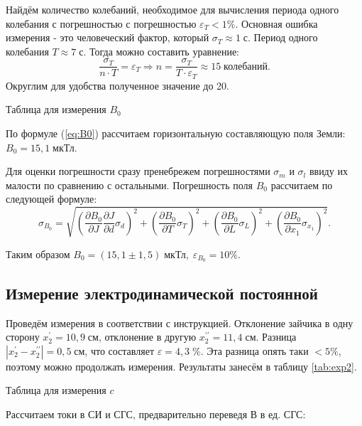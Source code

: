 \documentclass[12pt,a4paper]{article}
\begin{document}
Найдём количество колебаний, необходимое для вычисления периода одного колебания с погрешностью с погрешностью $\varepsilon_T<1\%$. Основная ошибка измерения - это человеческий фактор, который $\sigma_T \approx 1 \; \text{с}$. Период одного колебания $T \approx 7 \; \text{с}$. Тогда можно составить уравнение:
    $$\frac{\sigma_T}{n \cdot T} = \varepsilon_T \Rightarrow n = \frac{\sigma_T}{T\cdot \varepsilon_T} \approx 15 \; \text{колебаний.}$$
Округлим для удобства полученное значение до 20.

\begin{table}[H]
	\caption{Таблица для измерения $B_0$}
	
	\label{tab:exp1}
\end{table}

По формуле (\ref{eq:B0}) рассчитаем горизонтальную составляющую поля Земли: $B_0 = 15,1 \; \text{мкТл}$.

Для оценки погрешности сразу пренебрежем погрешностями $\sigma_m$ и $\sigma_l$ ввиду их малости по сравнению с остальными. Погрешность поля $B_0$ рассчитаем по следующей формуле:
$$\sigma_{B_0}=\sqrt{\left(\frac{\partial B_0}{\partial J}\frac{\partial J}{\partial d}\sigma_d \right)^2+\left(\frac{\partial B_0}{\partial T}\sigma_T \right)^2+\left(\frac{\partial B_0}{\partial L}\sigma_L \right)^2+\left(\frac{\partial B_0}{\partial x_1}\sigma_{x_1} \right)^2}.$$

Таким образом $B_0=\left(15,1\pm1,5\right) \; \text{мкТл}, \; \varepsilon_{B_0}=10\%$.

\newpage


\subsection*{Измерение электродинамической постоянной}

Проведём измерения в соответствии с инструкцией. Отклонение зайчика в одну сторону $x^\prime_2=10,9 \; \text{см}$, отклонение в другую $x^{\prime\prime}_2=11,4 \; \text{см}$. Разница $|x^\prime_2-x^{\prime\prime}_2|=0,5 \; \text{см}$, что составляет $\varepsilon=4,3\; \%$. Эта разница опять таки $<5\%$, поэтому можно продолжать измерения. Результаты занесём в таблицу \ref{tab:exp2}.

\begin{table}[H]
	\caption{Таблица для измерения $c$}
	
	\label{tab:exp2}
\end{table}

Рассчитаем токи в СИ и СГС, предварительно переведя В в ед. СГС:
\end{document}
